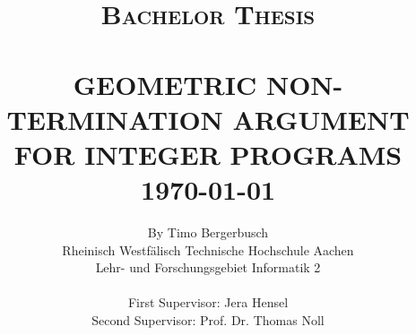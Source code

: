 
\title{ \normalsize \textsc{Bachelor Thesis}
	\\ [2.0cm]
	\HRule{0.5pt} \\
	\LARGE \textbf{\uppercase{Geometric Non-Termination Argument for Integer Programs}}
	\HRule{2pt} \\ [0.5cm]
	\normalsize \today \vspace*{5\baselineskip}}

\date{}

\author{
	By Timo Bergerbusch\\ 
	Rheinisch Westfälisch Technische Hochschule Aachen \\
	Lehr- und Forschungsgebiet Informatik 2  \\ \\
	First Supervisor: Jera Hensel \\
	Second Supervisor: Prof. Dr. Thomas Noll}

\maketitle